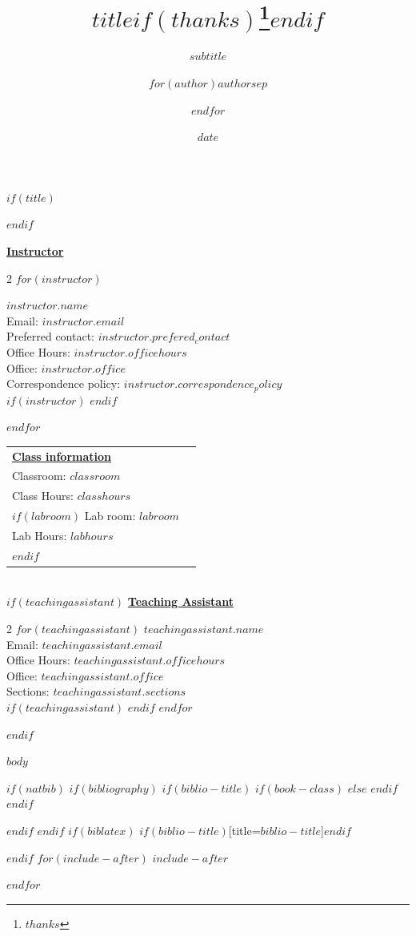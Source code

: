 \documentclass[$if(fontsize)$$fontsize$,$endif$$if(lang)$$babel-lang$,$endif$$if(papersize)$$papersize$,$endif$$for(classoption)$$classoption$$sep$,$endfor$]{article}
\title{$title$$if(thanks)$\thanks{$thanks$}$endif$}
\subtitle{$subtitle$}
\author{$for(author)$$author$$sep$ \and $endfor$}
\date{$date$}
\begin{document}
  

	$if(title)$
	\maketitle
	$endif$
	
	
		\thispagestyle{firststyle}

\textbf{\underline{Instructor}}
\begin{multicols}{2}
$for(instructor)$

  \textbf{$instructor.name$}\\
  Email: $instructor.email$\\
  Preferred contact: $instructor.prefered_contact$\\
  Office Hours: $instructor.officehours$\\
  Office: $instructor.office$\\
  Correspondence policy: $instructor.correspondence_policy$\\
  $if(instructor)$
  \columnbreak
  $endif$
  
$endfor$
  \end{multicols}
	
\noindent \begin{tabular*}{\textwidth}{ @{\extracolsep{\fill}} lr @{\extracolsep{\fill}}}
\textbf{\underline{Class information}}\\
  Classroom: $classroom$\\
  Class Hours: $classhours$\\
  $if(labroom)$
  Lab room: $labroom$\\
  Lab Hours: $labhours$\\
  $endif$
  \\
	\end{tabular*}\\

$if(teachingassistant)$
\noindent\textbf{\underline{Teaching Assistant}}
  \begin{multicols}{2}
$for(teachingassistant)$
  \noindent\textbf{$teachingassistant.name$}\\
  Email: $teachingassistant.email$\\
  Office Hours: $teachingassistant.officehours$\\
  Office: $teachingassistant.office$\\
  Sections: $teachingassistant.sections$\\
  $if(teachingassistant)$
  \columnbreak
  $endif$
$endfor$
\end{multicols}

	$endif$

\vspace{2mm}


$body$




$if(natbib)$
$if(bibliography)$
$if(biblio-title)$
$if(book-class)$
\renewcommand\bibname{$biblio-title$}
$else$
\renewcommand\refname{$biblio-title$}
$endif$
$endif$


$endif$
$endif$
$if(biblatex)$
\printbibliography$if(biblio-title)$[title=$biblio-title$]$endif$

$endif$
$for(include-after)$
$include-after$

$endfor$
\end{document}
